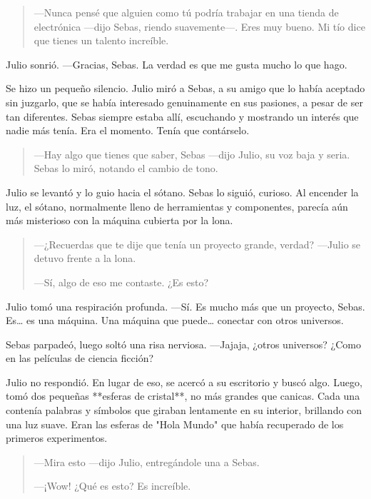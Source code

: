 \documentclass[a4paper,12pt]{book}
\begin{document}
\begin{quote}
    —Nunca pensé que alguien como tú podría trabajar en una tienda de electrónica —dijo Sebas, riendo suavemente—. Eres muy bueno. Mi tío dice que tienes un talento increíble.
\end{quote}

Julio sonrió. —Gracias, Sebas. La verdad es que me gusta mucho lo que hago.

Se hizo un pequeño silencio. Julio miró a Sebas, a su amigo que lo había aceptado sin juzgarlo, que se había interesado genuinamente en sus pasiones, a pesar de ser tan diferentes. Sebas siempre estaba allí, escuchando y mostrando un interés que nadie más tenía. Era el momento. Tenía que contárselo.

\begin{quote}
    —Hay algo que tienes que saber, Sebas —dijo Julio, su voz baja y seria. Sebas lo miró, notando el cambio de tono.
\end{quote}

Julio se levantó y lo guio hacia el sótano. Sebas lo siguió, curioso. Al encender la luz, el sótano, normalmente lleno de herramientas y componentes, parecía aún más misterioso con la máquina cubierta por la lona.

\begin{quote}
    —¿Recuerdas que te dije que tenía un proyecto grande, verdad? —Julio se detuvo frente a la lona.

    —Sí, algo de eso me contaste. ¿Es esto?
\end{quote}

Julio tomó una respiración profunda. —Sí. Es mucho más que un proyecto, Sebas. Es… es una máquina. Una máquina que puede… conectar con otros universos.

Sebas parpadeó, luego soltó una risa nerviosa. —Jajaja, ¿otros universos? ¿Como en las películas de ciencia ficción?

Julio no respondió. En lugar de eso, se acercó a su escritorio y buscó algo. Luego, tomó dos pequeñas **esferas de cristal**, no más grandes que canicas. Cada una contenía palabras y símbolos que giraban lentamente en su interior, brillando con una luz suave. Eran las esferas de "Hola Mundo" que había recuperado de los primeros experimentos.

\begin{quote}
    —Mira esto —dijo Julio, entregándole una a Sebas.

    —¡Wow! ¿Qué es esto? Es increíble.
\end{quote}
\end{document}

